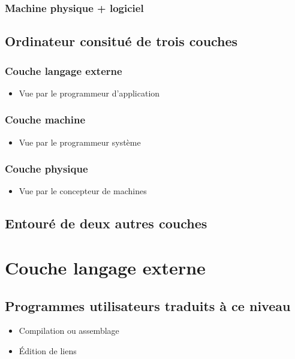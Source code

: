 			\subsubsection{Machine physique + logiciel}
		\subsection{Ordinateur consitué de trois couches}
			\subsubsection{Couche langage externe}
				\begin{itemize}
					\item [\textbullet] Vue par le programmeur d'application
				\end{itemize}
			\subsubsection{Couche machine}
				\begin{itemize}
					\item [\textbullet] Vue par le programmeur système 
				\end{itemize}
			\subsubsection{Couche physique}
				\begin{itemize}
					\item [\textbullet]Vue par le concepteur de machines 
				\end{itemize}
		\subsection{Entouré de deux autres couches}
	\section{Couche langage externe}
		\subsection{Programmes utilisateurs traduits à ce niveau}
			\begin{itemize}
				\item[\textbullet]Compilation ou assemblage
				\item[\textbullet]Édition de liens
			\end{itemize}
			

